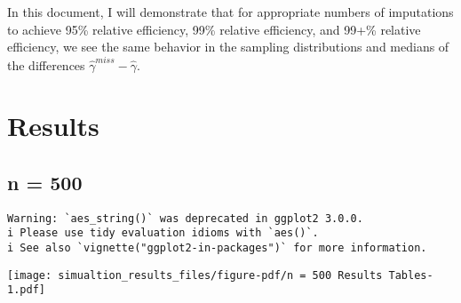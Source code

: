 \documentclass[
  letterpaper,
  DIV=11,
  numbers=noendperiod]{scrartcl}
\begin{document}
In this document, I will demonstrate that for appropriate numbers of
imputations to achieve 95\% relative efficiency, 99\% relative
efficiency, and 99+\% relative efficiency, we see the same behavior in
the sampling distributions and medians of the differences
\(\hat{\gamma}^{miss} - \hat{\gamma}\).

\hypertarget{results}{%
\section{Results}\label{results}}

\hypertarget{n-500}{%
\subsection{n = 500}\label{n-500}}

\begin{verbatim}
Warning: `aes_string()` was deprecated in ggplot2 3.0.0.
i Please use tidy evaluation idioms with `aes()`.
i See also `vignette("ggplot2-in-packages")` for more information.
\end{verbatim}

\texttt{[image: simualtion\_results\_files/figure-pdf/n = 500 Results Tables-1.pdf]}
\end{document}
